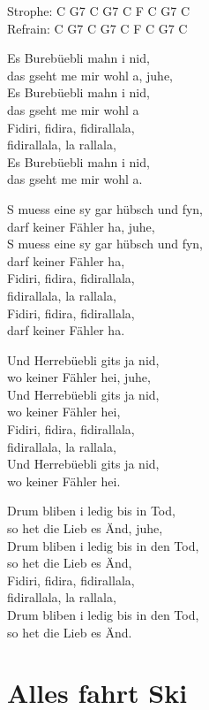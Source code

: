 \documentclass[
  letterpaper,
  twoside=false]{scrbook}
\begin{document}
Strophe: C G7 C G7 C F C G7 C\\
Refrain: C G7 C G7 C F C G7 C

Es Burebüebli mahn i nid,\\
das gseht me mir wohl a, juhe,\\
Es Burebüebli mahn i nid,\\
das gseht me mir wohl a\\
Fidiri, fidira, fidirallala,\\
fidirallala, la rallala,\\
Es Burebüebli mahn i nid,\\
das gseht me mir wohl a.

S muess eine sy gar hübsch und fyn,\\
darf keiner Fähler ha, juhe,\\
S muess eine sy gar hübsch und fyn,\\
darf keiner Fähler ha,\\
Fidiri, fidira, fidirallala,\\
fidirallala, la rallala,\\
Fidiri, fidira, fidirallala,\\
darf keiner Fähler ha.

Und Herrebüebli git\textquotesingle s ja nid,\\
wo keiner Fähler hei, juhe,\\
Und Herrebüebli git\textquotesingle s ja nid,\\
wo keiner Fähler hei,\\
Fidiri, fidira, fidirallala,\\
fidirallala, la rallala,\\
Und Herrebüebli git\textquotesingle s ja nid,\\
wo keiner Fähler hei.

Drum bliben i ledig bis in Tod,\\
so het die Lieb es Änd, juhe,\\
Drum bliben i ledig bis in den Tod,\\
so het die Lieb es Änd,\\
Fidiri, fidira, fidirallala,\\
fidirallala, la rallala,\\
Drum bliben i ledig bis in den Tod,\\
so het die Lieb es Änd.

\hypertarget{alles-fahrt-ski}{%
\chapter{Alles fahrt Ski}\label{alles-fahrt-ski}}
\end{document}
